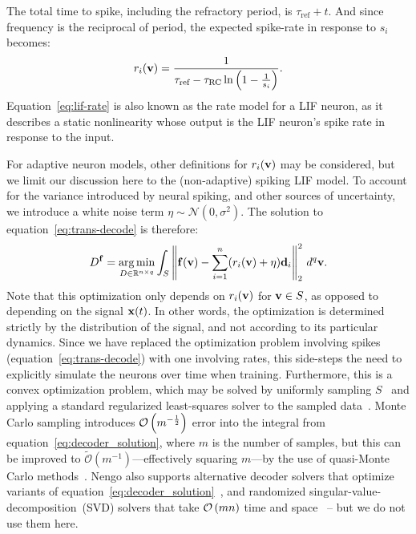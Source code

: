 The total time to spike, including the refractory period, is $\tau_\text{ref} + t$. And since frequency is the reciprocal of period, the expected spike-rate in response to $s_i$ becomes:
\begin{equation} \label{eq:lif-rate}
r_i(\mathbf{v}) = \frac{1}{\tau_\text{ref} -\tau_\text{RC} \ln \left( 1 - \frac{1}{s_i} \right)} \text{.}
\end{equation}
Equation~\ref{eq:lif-rate} is also known as the rate model for a LIF neuron, as it describes a static nonlinearity whose output is the LIF neuron's spike rate in response to the input.

For adaptive neuron models, other definitions for $r_i(\mathbf{v})$ may be considered, but we limit our discussion here to the (non-adaptive) spiking LIF model.
To account for the variance introduced by neural spiking, and other sources of uncertainty, we introduce a white noise term $\eta \sim \mathcal{N}(0, \sigma^2)$.
The solution to equation~\ref{eq:trans-decode} is therefore:
\begin{equation} \label{eq:decoder_solution}
D^{\mathbf{f}} = \operatorname*{arg\,min}_{D \in \mathbb{R}^{n \times q}} \int_{S} \left\| \mathbf{f}(\mathbf{v}) - \sum_{i=1}^n (r_i(\mathbf{v}) + \eta) \mathbf{d}_i \right\|_2^2 \, d^q\mathbf{v} \text{.}
\end{equation}
Note that this optimization only depends on $r_i(\mathbf{v})$ for $\mathbf{v} \in S$, as opposed to depending on the signal $\mathbf{x}(t)$.
In other words, the optimization is determined strictly by the distribution of the signal, and not according to its particular dynamics.
Since we have replaced the optimization problem involving spikes (equation~\ref{eq:trans-decode}) with one involving rates, this side-steps the need to explicitly simulate the neurons over time when training.
Furthermore, this is a convex optimization problem, which may be solved by uniformly sampling $S$~\citep{voelker2017} and applying a standard regularized least-squares solver to the sampled data~\citep{bekolay2013}.
Monte Carlo sampling introduces $\mathcal{O}\left({ m^{-\frac{1}{2}} }\right)$ error into the integral from equation~\ref{eq:decoder_solution}, where $m$ is the number of samples, but this can be improved to $\widetilde{\mathcal{O}} \left( m^{-1} \right)$---effectively squaring $m$---by the use of quasi-Monte Carlo methods~\citep{fang1994, knight2016}.
Nengo also supports alternative decoder solvers that optimize variants of equation~\ref{eq:decoder_solution}~\citep[e.g.,][]{voelker2016a, abrams2017}, and randomized singular-value-decomposition~(SVD) solvers that take $\mathcal{O}\left({mn}\right)$ time and space~\citep{halko2011finding} -- but we do not use them here.

